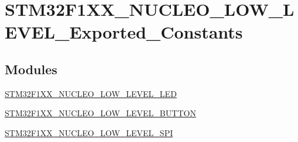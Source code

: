\hypertarget{group___s_t_m32_f1_x_x___n_u_c_l_e_o___l_o_w___l_e_v_e_l___exported___constants}{}\section{S\+T\+M32\+F1\+X\+X\+\_\+\+N\+U\+C\+L\+E\+O\+\_\+\+L\+O\+W\+\_\+\+L\+E\+V\+E\+L\+\_\+\+Exported\+\_\+\+Constants}
\label{group___s_t_m32_f1_x_x___n_u_c_l_e_o___l_o_w___l_e_v_e_l___exported___constants}
\subsection*{Modules}
\begin{DoxyCompactItemize}
\item 
\mbox{\hyperlink{group___s_t_m32_f1_x_x___n_u_c_l_e_o___l_o_w___l_e_v_e_l___l_e_d}{S\+T\+M32\+F1\+X\+X\+\_\+\+N\+U\+C\+L\+E\+O\+\_\+\+L\+O\+W\+\_\+\+L\+E\+V\+E\+L\+\_\+\+L\+ED}}
\item 
\mbox{\hyperlink{group___s_t_m32_f1_x_x___n_u_c_l_e_o___l_o_w___l_e_v_e_l___b_u_t_t_o_n}{S\+T\+M32\+F1\+X\+X\+\_\+\+N\+U\+C\+L\+E\+O\+\_\+\+L\+O\+W\+\_\+\+L\+E\+V\+E\+L\+\_\+\+B\+U\+T\+T\+ON}}
\item 
\mbox{\hyperlink{group___s_t_m32_f1_x_x___n_u_c_l_e_o___l_o_w___l_e_v_e_l___s_p_i}{S\+T\+M32\+F1\+X\+X\+\_\+\+N\+U\+C\+L\+E\+O\+\_\+\+L\+O\+W\+\_\+\+L\+E\+V\+E\+L\+\_\+\+S\+PI}}
\end{DoxyCompactItemize}
